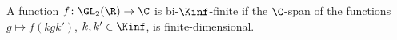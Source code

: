 A function $f\colon\GL_2(\R)\to\C$ is bi-$\Kinf$-finite if the $\C$-span of the functions $g\mapsto f(kgk')$, $k,k'\in\Kinf$, is finite-dimensional.
